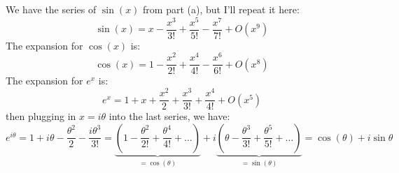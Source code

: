 \documentclass[10pt]{article}
\begin{document}
\begin{enumerate}[label=\alph*),resume ]
			\begin{solution}
				We have the series of $\sin(x)$ from part (a), but I'll repeat it here:
				\[
				\sin(x) = x - \frac{x^3}{3!} + \frac{x^5}{5!} - \frac{x^7}{7!} + O(x^9)
				\] 
				The expansion for $\cos(x)$ is:
				\[
				\cos(x) = 1 - \frac{x^2}{2!} + \frac{x^4}{4!} - \frac{x^6}{6!} + O(x^8)
				\] 
				The expansion for $e^x$ is:
				\[
				e^x = 1 + x + \frac{x^2}{2} + \frac{x^3}{3!} + \frac{x^4}{4!} + O(x^5)
				\] 
				then plugging in $x = i \theta$ into the last series, we have:
				\[
					e^{i \theta} = 1 + i \theta - \frac{\theta^2}{2}-\frac{i\theta^3}{3!}=\underbrace{\left( 1 -
					\frac{\theta^2}{2!} + \frac{\theta^4}{4!}  + \dots \right)}_{= \cos(\theta)} +
					i \underbrace{\left( \theta
			- \frac{\theta^3}{3!} + \frac{\theta^5}{5!} + \dots \right)}_{= \sin(\theta)}  = \cos(\theta) + i
			\sin \theta
				\] 
			\end{solution}
	\end{enumerate}
	\pagebreak
\end{document}
